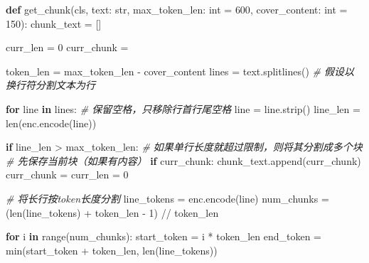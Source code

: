 \documentclass[
]{article}
\newenvironment{Shaded}{}{}
\newcommand{\BuiltInTok}[1]{\textcolor[rgb]{0.00,0.50,0.00}{#1}}
\newcommand{\CommentTok}[1]{\textcolor[rgb]{0.38,0.63,0.69}{\textit{#1}}}
\newcommand{\ControlFlowTok}[1]{\textcolor[rgb]{0.00,0.44,0.13}{\textbf{#1}}}
\newcommand{\DecValTok}[1]{\textcolor[rgb]{0.25,0.63,0.44}{#1}}
\newcommand{\KeywordTok}[1]{\textcolor[rgb]{0.00,0.44,0.13}{\textbf{#1}}}
\newcommand{\NormalTok}[1]{#1}
\newcommand{\OperatorTok}[1]{\textcolor[rgb]{0.40,0.40,0.40}{#1}}
\newcommand{\StringTok}[1]{\textcolor[rgb]{0.25,0.44,0.63}{#1}}
\begin{document}
\begin{Shaded}
\begin{Highlighting}[]
\KeywordTok{def}\NormalTok{ get\_chunk(cls, text: }\BuiltInTok{str}\NormalTok{, max\_token\_len: }\BuiltInTok{int} \OperatorTok{=} \DecValTok{600}\NormalTok{, cover\_content: }\BuiltInTok{int} \OperatorTok{=} \DecValTok{150}\NormalTok{):}
\NormalTok{    chunk\_text }\OperatorTok{=}\NormalTok{ []}

\NormalTok{    curr\_len }\OperatorTok{=} \DecValTok{0}
\NormalTok{    curr\_chunk }\OperatorTok{=} \StringTok{\textquotesingle{}\textquotesingle{}}

\NormalTok{    token\_len }\OperatorTok{=}\NormalTok{ max\_token\_len }\OperatorTok{{-}}\NormalTok{ cover\_content}
\NormalTok{    lines }\OperatorTok{=}\NormalTok{ text.splitlines()  }\CommentTok{\# 假设以换行符分割文本为行}

    \ControlFlowTok{for}\NormalTok{ line }\KeywordTok{in}\NormalTok{ lines:}
        \CommentTok{\# 保留空格，只移除行首行尾空格}
\NormalTok{        line }\OperatorTok{=}\NormalTok{ line.strip()}
\NormalTok{        line\_len }\OperatorTok{=} \BuiltInTok{len}\NormalTok{(enc.encode(line))}
        
        \ControlFlowTok{if}\NormalTok{ line\_len }\OperatorTok{\textgreater{}}\NormalTok{ max\_token\_len:}
            \CommentTok{\# 如果单行长度就超过限制，则将其分割成多个块}
            \CommentTok{\# 先保存当前块（如果有内容）}
            \ControlFlowTok{if}\NormalTok{ curr\_chunk:}
\NormalTok{                chunk\_text.append(curr\_chunk)}
\NormalTok{                curr\_chunk }\OperatorTok{=} \StringTok{\textquotesingle{}\textquotesingle{}}
\NormalTok{                curr\_len }\OperatorTok{=} \DecValTok{0}
            
            \CommentTok{\# 将长行按token长度分割}
\NormalTok{            line\_tokens }\OperatorTok{=}\NormalTok{ enc.encode(line)}
\NormalTok{            num\_chunks }\OperatorTok{=}\NormalTok{ (}\BuiltInTok{len}\NormalTok{(line\_tokens) }\OperatorTok{+}\NormalTok{ token\_len }\OperatorTok{{-}} \DecValTok{1}\NormalTok{) }\OperatorTok{//}\NormalTok{ token\_len}
            
            \ControlFlowTok{for}\NormalTok{ i }\KeywordTok{in} \BuiltInTok{range}\NormalTok{(num\_chunks):}
\NormalTok{                start\_token }\OperatorTok{=}\NormalTok{ i }\OperatorTok{*}\NormalTok{ token\_len}
\NormalTok{                end\_token }\OperatorTok{=} \BuiltInTok{min}\NormalTok{(start\_token }\OperatorTok{+}\NormalTok{ token\_len, }\BuiltInTok{len}\NormalTok{(line\_tokens))}
                

\end{Highlighting}
\end{Shaded}
\end{document}
